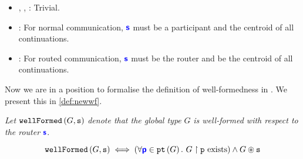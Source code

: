 \begin{itemize}
\item 
{}, 
, 
:
Trivial.

\item 
{}:
For normal communication, ${\color{blue}\bm{\mathsf{s}}}$ must
be a participant and the centroid of all continuations.

\item 
{}:
For routed communication, ${\color{blue}\bm{\mathsf{s}}}$ must
be the router and be the centroid of all continuations.

\end{itemize}

Now we are in a position to formalise the definition
of well-formedness in \newtheory. We present this in
\cref{def:newwf}.

\begin{definition}
\textit{Let} $\texttt{wellFormed}\left(G, {\mathtt{s}}\right)$ 
\textit{denote that the global type} $G$
\textit{is well-formed with respect to the router} ${\color{blue}\bm{\mathsf{s}}}$.

\[
\texttt{wellFormed}\left(G, {\mathtt{s}}\right) \iff 
(\forall {\color{blue}\bm{\mathsf{p}}} \in \texttt{pt}\left({G}\right). ~ {G} \upharpoonright {\mathtt{p}} \text{ exists})
\wedge
{G} \circledast {\mathtt{s}}
\]

\label{def:newwf}
\end{definition}